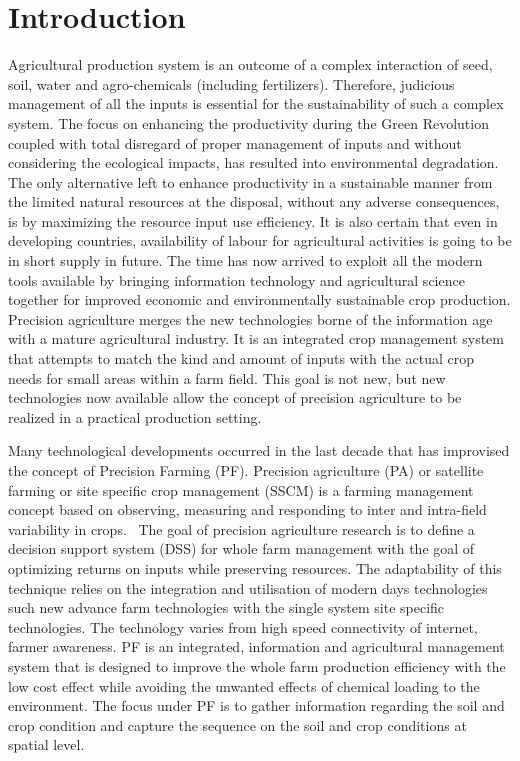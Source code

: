 \chapter{Introduction}

Agricultural production system is an outcome of a complex interaction of seed, soil, water and agro-chemicals (including fertilizers). Therefore, judicious management of all the inputs is essential for the sustainability of such a complex system. The focus on enhancing the productivity during the Green Revolution coupled with total disregard of proper management of inputs and without considering the ecological impacts, has resulted into environmental degradation. The only alternative left to enhance productivity in a sustainable manner from the limited natural resources at the disposal, without any adverse consequences, is by maximizing the resource input use efficiency. It is also certain that even in developing countries, availability of labour for agricultural activities is going to be in short supply in future. The time has now arrived to exploit all the modern tools available by bringing information technology and agricultural science together for improved economic and environmentally sustainable crop production. Precision agriculture merges the new technologies borne of the information age with a mature agricultural industry. It is an integrated crop management system that attempts to match the kind and amount of inputs with the actual crop needs for small areas within a farm field. This goal is not new, but new technologies now available allow the concept of precision agriculture to be realized in a practical production setting.

Many technological developments occurred in the last decade that has improvised the concept of Precision Farming (PF). Precision agriculture (PA) or satellite farming or site specific crop management (SSCM) is a farming management concept based on observing, measuring and responding to inter and intra-field variability in crops.~\cite{mcbratney2005future,whelan2003definition} The goal of precision agriculture research is to define a decision support system (DSS) for whole farm management with the goal of optimizing returns on inputs while preserving resources. The adaptability of this technique relies on the integration and utilisation of modern days technologies such new advance farm technologies with the single system site specific technologies. The technology varies from high speed connectivity of internet, farmer awareness. PF is an integrated, information and agricultural management system that is designed to improve the whole farm production efficiency with the low cost effect while avoiding the unwanted effects of chemical loading to the environment. The focus under PF is to gather information regarding the soil and crop condition and capture the sequence on the soil and crop conditions at spatial level.

